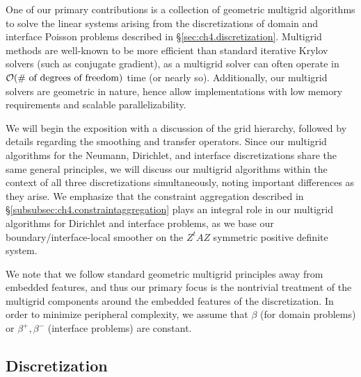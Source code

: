 One of our primary contributions is a collection of geometric multigrid algorithms to solve the linear systems arising from the discretizations of domain and interface Poisson problems described in \S\ref{sec:ch4.discretization}. Multigrid methods are well-known to be more efficient than standard iterative Krylov solvers (such as conjugate gradient), as a multigrid solver can often operate in $\mathcal{O}(\text{\# of degrees of freedom})$ time (or nearly so). Additionally, our multigrid solvers are geometric in nature, hence allow implementations with low memory requirements and scalable parallelizability.

We will begin the exposition with a discussion of the grid hierarchy, followed by details regarding the smoothing and transfer operators. Since our multigrid algorithms for the Neumann, Dirichlet, and interface discretizations share the same general principles, we will discuss our multigrid algorithms within the context of all three discretizations simultaneously, noting important differences as they arise. We emphasize that the constraint aggregation described in \S\ref{subsubsec:ch4.constraintaggregation} plays an integral role in our multigrid algorithms for Dirichlet and interface problems, as we base our boundary/interface-local smoother on the $Z^tAZ$ symmetric positive definite system.

We note that we follow standard geometric multigrid principles away from embedded features, and thus our primary focus is the nontrivial treatment of the multigrid components around the embedded features of the discretization. In order to minimize peripheral complexity, we assume that $\beta$ (for domain problems) or $\beta^+, \beta^-$ (interface problems) are constant.

\subsection{Discretization} \label{subsec:ch4.multigrid.discretization}

